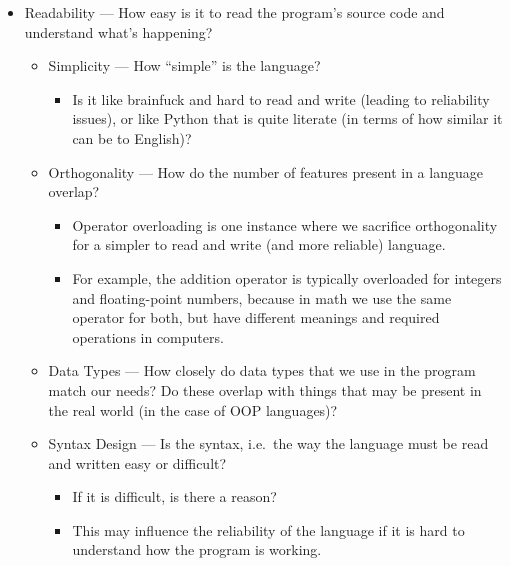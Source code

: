 \begin{itemize}
\item Readability --- How easy is it to read the program's source code and understand what's happening?
  \begin{itemize}
  \item Simplicity --- How ``simple'' is the language?
    \begin{itemize}[noitemsep]
    \item Is it like brainfuck and hard to read and write (leading to reliability issues), or like Python that is quite literate (in terms of how similar it can be to English)?
    \end{itemize}

  \item Orthogonality --- How do the number of features present in a language overlap?
    \begin{itemize}[noitemsep]
    \item Operator overloading is one instance where we sacrifice orthogonality for a simpler to read and write (and more reliable) language.
    \item For example, the addition operator is typically overloaded for integers and floating-point numbers, because in math we use the same operator for both, but have different meanings and required operations in computers.
    \end{itemize}

  \item Data Types --- How closely do data types that we use in the program match our needs? Do these overlap with things that may be present in the real world (in the case of OOP languages)?
  \item Syntax Design --- Is the syntax, i.e.\ the way the language must be read and written easy or difficult?
    \begin{itemize}[noitemsep]
    \item If it is difficult, is there a reason?
    \item This may influence the reliability of the language if it is hard to understand how the program is working.
    \end{itemize}
  \end{itemize}


\end{itemize}
